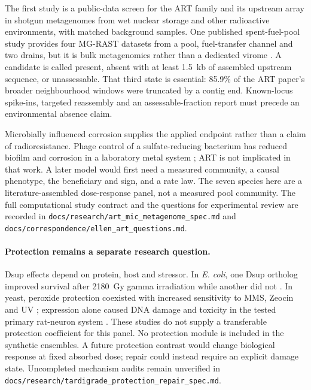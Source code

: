 \documentclass[11pt]{article}
\begin{document}
The first study is a public-data screen for the ART family and its upstream array in shotgun
metagenomes from wet nuclear storage and other radioactive environments, with matched background
samples. One published spent-fuel-pool study provides four MG-RAST datasets from a pool,
fuel-transfer channel and two drains, but it is bulk metagenomics rather than a dedicated virome
\cite{pereira2018}. A candidate is called present, absent with at least 1.5~kb of assembled upstream
sequence, or unassessable. That third state is essential: 85.9\% of the ART paper's broader
neighbourhood windows were truncated by a contig end. Known-locus spike-ins, targeted reassembly
and an assessable-fraction report must precede an environmental absence claim.

Microbially influenced corrosion supplies the applied endpoint rather than a claim of
radioresistance. Phage control of a sulfate-reducing bacterium has reduced biofilm and corrosion in
a laboratory metal system \cite{zhang2025phage}; ART is not implicated in that work. A later model
would first need a measured community, a causal phenotype, the beneficiary and sign, and a rate law.
The seven species here are a literature-assembled dose-response panel, not a measured pool
community. The full computational study contract and the questions for experimental review are
recorded in \texttt{docs/research/art\_mic\_metagenome\_spec.md} and
\texttt{docs/correspondence/ellen\_art\_questions.md}.

\paragraph{Protection remains a separate research question.}
Dsup effects depend on protein, host and stressor. In \emph{E. coli}, one Dsup ortholog improved
survival after 2180~Gy gamma irradiation while another did not \cite{clarkhachtel2024}.
In yeast, peroxide protection coexisted with increased sensitivity to MMS, Zeocin and UV
\cite{aguilar2025dsup}; expression alone caused DNA damage and toxicity in the tested primary
rat-neuron system \cite{diaz2023dsup}. These studies do not supply a transferable protection
coefficient for this panel. No protection module is included in the synthetic ensembles.
A future protection contrast would change biological response at fixed absorbed dose; repair
could instead require an explicit damage state. Uncompleted mechanism audits remain unverified
in \texttt{docs/research/tardigrade\_protection\_repair\_spec.md}.
\end{document}
